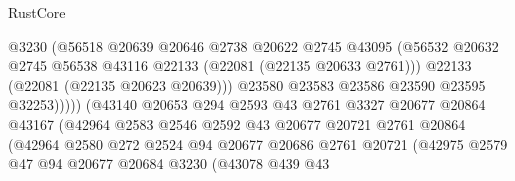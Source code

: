 \begin{lexlean}{RustCore}
\begin{coremodule}
                                      @3230
                                      (@56518
                                        @20639
                                        @20646
                                        @2738
                                        @20622
                                        @2745
                                        @43095
                                        (@56532
                                          @20632
                                          @2745
                                          @56538
                                          @43116
                                          @22133
                                          (@22081 (@22135 @20633 @2761)))
                                        @22133
                                        (@22081 (@22135 @20623 @20639)))
                                      @23580
                                      @23583
                                      @23586
                                      @23590
                                      @23595
                                      @32253)))))
                            (@43140
                              @20653
                              @294
                              @2593
                              @43
                              @2761
                              @3327
                              @20677
                              @20864
                              @43167
                              (@42964
                                @2583
                                @2546
                                @2592
                                @43
                                @20677
                                @20721
                                @2761
                                @20864
                                (@42964
                                  @2580
                                  @272
                                  @2524
                                  @94
                                  @20677
                                  @20686
                                  @2761
                                  @20721
                                  (@42975
                                    @2579
                                    @47
                                    @94
                                    @20677
                                    @20684
                                    @3230
                                    (@43078
                                      @439
                                      @43

\end{coremodule}
\end{lexlean}

